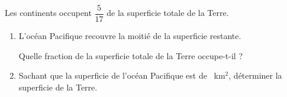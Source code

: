 
\medskip

Les continents occupent $\dfrac{5}{17}$ de la superficie totale de la Terre.


\medskip

\begin{enumerate}
\item L'océan Pacifique recouvre la moitié de la superficie restante.

Quelle fraction de la superficie totale de la Terre occupe-t-il ?
\item Sachant que la superficie de l'océan Pacifique est de ~km$^2$, déterminer la superficie de la Terre.
\end{enumerate}
